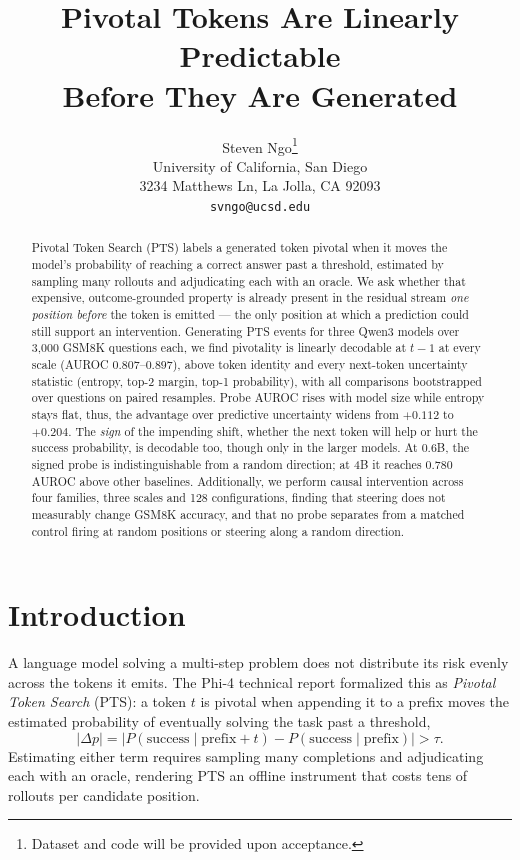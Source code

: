 \documentclass{article}
\title{Pivotal Tokens Are Linearly Predictable\\ Before They Are Generated}
\author{%
  Steven Ngo\thanks{Dataset and code will be provided upon acceptance.} \\
  University of California, San Diego \\
  3234 Matthews Ln, La Jolla, CA 92093 \\
  \texttt{svngo@ucsd.edu} \\
}
\newcommand{\pdelta}{\Delta p}
\begin{document}
\maketitle

\begin{abstract}
Pivotal Token Search (PTS) labels a generated token pivotal when it moves
the model's probability of reaching a correct answer past a threshold,
estimated by sampling many rollouts and adjudicating each with an oracle.
We ask whether that expensive, outcome-grounded property is already
present in the residual stream \emph{one position before} the token is
emitted --- the only position at which a prediction could still support an
intervention. Generating PTS events for three Qwen3 models over 3{,}000
GSM8K questions each, we find pivotality is linearly decodable at $t{-}1$
at every scale (AUROC $0.807$--$0.897$), above token identity and
every next-token uncertainty statistic (entropy, top-2 margin, top-1 probability), 
with all comparisons bootstrapped over questions on paired resamples. 
Probe AUROC rises with model size while entropy stays flat, 
thus, the advantage over predictive uncertainty widens
from $+0.112$ to $+0.204$. The \emph{sign} of the impending shift,
whether the next token will help or hurt the success probability, is decodable too, 
though only in the larger models. At 0.6B, the signed probe is
indistinguishable from a random direction; at 4B it reaches $0.780$
AUROC above other baselines. Additionally, we perform causal intervention across four families, 
three scales and 128 configurations, finding that steering does not measurably change GSM8K accuracy, 
and that no probe separates from a matched control firing at random positions
or steering along a random direction.
\end{abstract}

\section{Introduction}
\label{sec:intro}

A language model solving a multi-step problem does not distribute its risk
evenly across the tokens it emits. The Phi-4 technical report
\citep{abdin2024phi4technicalreport} formalized this as \emph{Pivotal Token
Search} (PTS): a token $t$ is pivotal when appending it to a prefix moves
the estimated probability of eventually solving the task past a threshold,
\begin{equation}
  \label{eq:pts}
  |\pdelta| = \bigl| P(\text{success} \mid \text{prefix} + t)
              - P(\text{success} \mid \text{prefix}) \bigr| > \tau .
\end{equation}
Estimating either term requires sampling many completions and adjudicating
each with an oracle, rendering PTS an offline instrument that costs tens of
rollouts per candidate position.
\end{document}
